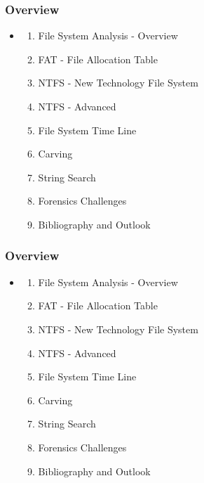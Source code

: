 \documentclass{beamer}
\begin{document}
\begin{frame}
  \frametitle{Overview}
  \begin{itemize}
  \item[]
      \begin{enumerate}
          \item File System Analysis - Overview
          \item FAT - File Allocation Table
          \item NTFS - New Technology File System
          \item NTFS - Advanced
          \item File System Time Line
          \item Carving
          \item String Search
          \item Forensics Challenges
          \item Bibliography and Outlook
      \end{enumerate}
  \end{itemize}
\end{frame}












\begin{frame}
  \frametitle{Overview}
  \begin{itemize}
  \item[]
      \begin{enumerate}
          \item File System Analysis - Overview
          \item FAT - File Allocation Table
          \item NTFS - New Technology File System
          \item NTFS - Advanced
          \item File System Time Line
          \item Carving
          \item String Search
          \item Forensics Challenges
          \item Bibliography and Outlook
      \end{enumerate}
  \end{itemize}
\end{frame}
\end{document}
